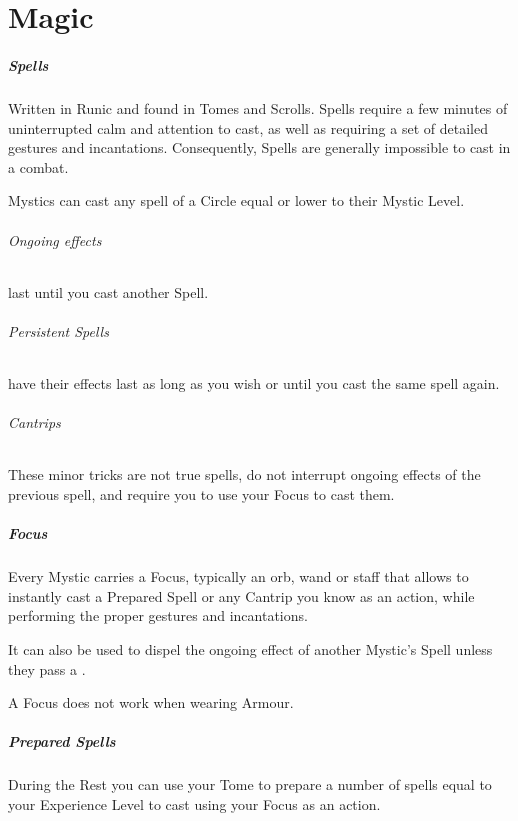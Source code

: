 \documentclass[itdr]{subfiles}
\begin{document}
\chapter{Magic}

\paragraph{Spells}
Written in Runic and found in Tomes and Scrolls. Spells require a few minutes of uninterrupted calm and attention to cast, as well as requiring a set of detailed gestures and incantations. Consequently, Spells are generally impossible to cast in a combat.

Mystics can cast any spell of a Circle equal or lower to their Mystic Level.

\subparagraph{Ongoing effects} last until you cast another Spell.

\subparagraph{Persistent Spells} have their effects last as long as you wish or until you cast the same spell again.

\subparagraph{Cantrips}
These minor tricks are not true spells, do not interrupt ongoing effects of the previous spell, and require you to use your Focus to cast them.

\paragraph{Focus}
Every Mystic carries a Focus, typically an orb, wand or staff that allows to instantly cast a Prepared Spell or any Cantrip you know as an action, while performing the proper gestures and incantations.

It can also be used to dispel the ongoing effect of another Mystic's Spell unless they pass a .

A Focus does not work when wearing Armour.

\paragraph{Prepared Spells}
During the Rest you can use your Tome to prepare a number of spells equal to your Experience Level to cast using your Focus as an action.
\end{document}
